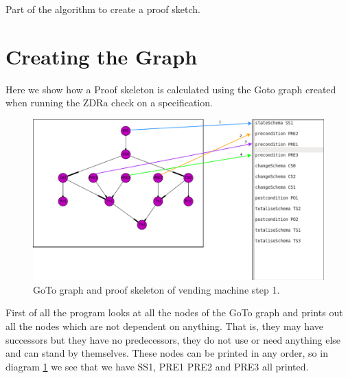 

\begin{algorithm}[H]
\BlankLine
{}
\caption{Part of the algorithm to create a proof sketch\label{alg:code}.}
\end{algorithm}

\section{Creating the Graph}

Here we show how a Proof skeleton is calculated using the Goto graph created when running the ZDRa check on a specification.

\begin{figure}[H]
\includegraphics[scale=0.3]{Figures/skeleton/1.png}
\caption{GoTo graph and proof skeleton of vending machine step 1.}
\label{fig:1}
\end{figure}

First of all the program looks at all the nodes of the GoTo graph and prints out all the nodes which are not dependent on anything. That is, they may have successors but they have no predecessors, they do not use or need anything else and can stand by themselves. These nodes can be printed in any order, so in diagram \ref{fig:1} we see that we have SS1, PRE1 PRE2 and PRE3 all printed.

